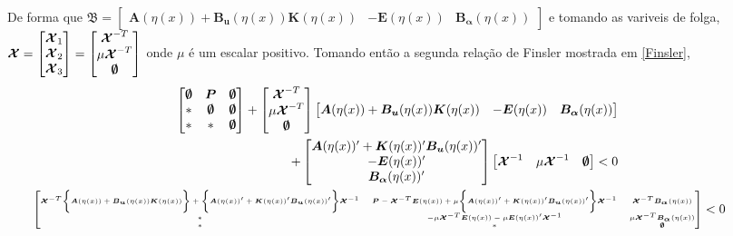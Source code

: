 \documentclass[a4paper,10pt]{article}
\begin{document}
\paragraph{}De forma que $\mathfrak{B} = 	\begin{bmatrix}
	\bm{A}(\eta(x))+\bm{B_u}(\eta(x))\bm{K}(\eta(x)) & -\bm{E}(\eta(x)) & \bm{B_{\alpha}}(\eta(x))
\end{bmatrix}$ e tomando as variveis de folga, $\bm{\mathcal{X}} = \begin{bmatrix}
\bm{\mathcal{X}}_{1} \\ \bm{\mathcal{X}}_{2} \\ \bm{\mathcal{X}}_{3}
\end{bmatrix} = \begin{bmatrix}
\bm{\mathcal{X}}^{-T} \\ \mu\bm{\mathcal{X}}^{-T} \\ \bm{\emptyset}
\end{bmatrix} $ onde $\mu$ é um escalar positivo. Tomando então a segunda relação de Finsler mostrada em \eqref{Finsler},
\begin{gather}
	\begin{split}
	\begin{bmatrix}
		\zero & \bm{P} & \zero \\
		* & \zero & \zero \\
		* & * & \zero
	\end{bmatrix} + \begin{bmatrix}
	\bm{\mathcal{X}}^{-T} \\ \mu\bm{\mathcal{X}}^{-T} \\ \zero
\end{bmatrix}	\begin{bmatrix}
\bm{A}(\eta(x))+\bm{B_u}(\eta(x))\bm{K}(\eta(x)) & -\bm{E}(\eta(x)) & \bm{B_{\alpha}}(\eta(x))
\end{bmatrix} \\
+ 	\begin{bmatrix}
	\bm{A}(\eta(x))'+\bm{K}(\eta(x))'\bm{B_u}(\eta(x))' \\ -\bm{E}(\eta(x))' \\ \bm{B_{\alpha}}(\eta(x))'
\end{bmatrix} \begin{bmatrix}
\bm{\mathcal{X}}^{-1} & \mu\bm{\mathcal{X}}^{-1} & \zero
\end{bmatrix} < 0
\end{split} \\
\hspace{-1cm}\tiny{\begin{bmatrix}
	\bm{\mathcal{X}}^{-T}\Biggl\{\Af + \Buf\Kf\Biggr\} + \Biggl\{\Af' + \Kf'\Buf'\Biggr\}\bm{\mathcal{X}}^{-1} & \bm{P} - \bm{\mathcal{X}}^{-T}\Ef + \mu\Biggl\{\Af' + \Kf'\Buf'\Biggr\}\bm{\mathcal{X}}^{-1}  & \bm{\mathcal{X}}^{-T}\Baf \\
	* & -\mu\bm{\mathcal{X}}^{-T}\Ef - \mu\Ef'\bm{\mathcal{X}}^{-1} & \mu\bm{\mathcal{X}}^{-T}\Baf \\
	* & * & \zero
\end{bmatrix} < 0}
\end{gather}
\end{document}

